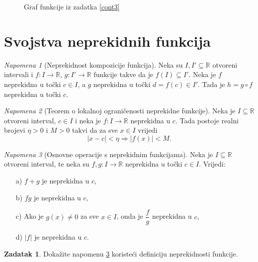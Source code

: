 \documentclass{book}
\renewenvironment{proof}{%
    \vspace{-\parskip}\begin{oldproof}%
    }{%
    \end{oldproof}%
}
\theoremstyle{definition}
\theoremstyle{definition}
\newtheorem{exercise}{Zadatak}
\theoremstyle{remark}
\newtheorem{remark}{Napomena}
\begin{document}
\begin{proof}[Rješenje]
\begin{figure}[ht]
\begin{center}
\end{center}
\caption{Graf funkcije iz zadatka \ref{cont3}}
\end{figure}
\end{proof}
\section{Svojstva neprekidnih funkcija}
\begin{remark}[Neprekidnost kompozicije funkcija]
\label{compcont}
Neka su $I, I'\subseteq \mathbb{R}$ otvoreni intervali i $f : I\to \mathbb{R}$, $g : I'\to \mathbb{R}$ funkcije takve da je $f(I)\subseteq I'$. Neka je $f$ neprekidna u točki $c\in I$, a $g$ neprekidna u točki $d=f(c)\in I'$. Tada je $h=g\circ f$ neprekidna u točki $c$.
\end{remark}
\begin{remark}[Teorem o lokalnoj ograničenosti neprekidne funkcije]
\label{localbound}
Neka je $I\subseteq \mathbb{R}$ otvoreni interval, $c\in I$ i neka je $f : I\to \mathbb{R}$ neprekidna u $c$. Tada postoje realni brojevi $\eta>0$ i $M>0$ takvi da za sve $x\in I$ vrijedi
$$|x-c|<\eta\Longrightarrow |f(x)|<M.$$
\end{remark}
\begin{remark}[Osnovne operacije s neprekidnim funkcijama]
\label{fundamentalopcont}
Neka je $I\subseteq \mathbb{R}$ otvoreni interval, te neka su $f, g : I\to \mathbb{R}$ neprekidna u točki $c\in I$. Vrijedi:
\begin{itemize}
\item[a)] $f+g$ je neprekidna u $c$,
\item[b)] $fg$ je neprekidna u $c$,
\item[c)] Ako je $g(x)\neq 0$ za sve $x\in I$, onda je $\dfrac{f}{g}$ neprekidna u $c$,
\item[d)] $|f|$ je neprekidna u $c$.
\end{itemize}
\end{remark}
\begin{exercise}
Dokažite napomenu \ref{fundamentalopcont} koristeći definiciju neprekidnosti funkcije.
\end{exercise}
\end{document}
